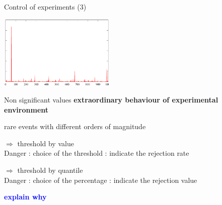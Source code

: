 \documentclass[xcolor=x11names,compress,8pt,
handout
]{beamer}
\renewcommand{\(}{\begin{columns}}
\renewcommand{\)}{\end{columns}}
\newcommand{\<}[1]{\begin{column}{#1}}
\renewcommand{\>}{\end{column}}
\begin{document}
\begin{frame}{Control of experiments (3)}
\begin{center}
\includegraphics[width=5.5cm]{CE-cauchy1.pdf}
\end{center}
\pause
\begin{block}{Non significant values}
\alert{\bf  extraordinary behaviour of experimental environment}

rare events with different orders of magnitude

$\Rightarrow$ threshold by value \\
Danger : choice of the threshold : indicate the rejection rate

$\Rightarrow$ threshold by quantile \\
Danger : choice of the percentage : indicate the rejection value

\textcolor{blue}{\bf explain why}
\end{block}
\end{frame}
\end{document}
